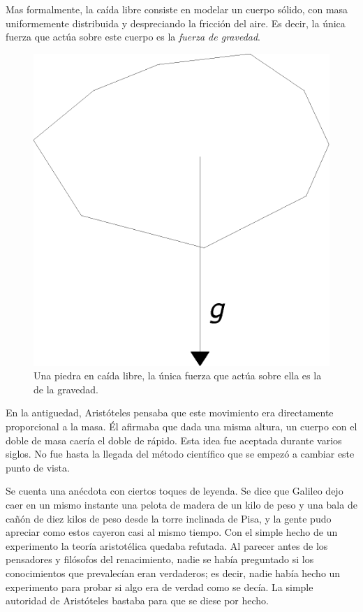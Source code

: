 Mas formalmente, la caída libre consiste en modelar un cuerpo sólido, con masa uniformemente distribuida y despreciando la fricción del aire. Es decir, la única fuerza que actúa sobre este cuerpo es la \emph{fuerza de gravedad}.

\begin{figure}
 \centering
 \includegraphics[]{Img/caida_libre}
 \caption[Ejemplo de caída libre]{ 
 Una piedra en caída libre, la única fuerza que actúa sobre ella es la de la gravedad.
 } \label{piedra:fig}
\end{figure}

En la antiguedad, Aristóteles pensaba que este movimiento era directamente proporcional a la masa. Él afirmaba que dada una misma altura, un cuerpo con el doble de masa caería el doble de rápido. Esta idea fue aceptada durante varios siglos. No fue hasta la llegada del método científico que se empezó a cambiar este punto de vista.

Se cuenta una anécdota con ciertos toques de leyenda. Se dice que Galileo dejo caer en un mismo instante una pelota de madera de un kilo de peso y una bala de cañón de diez kilos de peso desde la torre inclinada de Pisa, y la gente pudo apreciar como estos cayeron casi al mismo tiempo. Con el simple hecho de un experimento la teoría aristotélica quedaba refutada. Al parecer antes de los pensadores y filósofos del renacimiento, nadie se había preguntado si los conocimientos que prevalecían eran verdaderos; es decir, nadie había hecho un experimento para probar si algo era de verdad como se decía. La simple autoridad de Aristóteles bastaba para que se diese por hecho.

